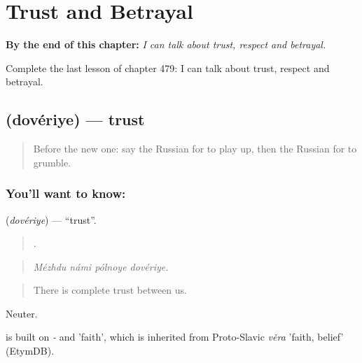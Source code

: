
\chapter{Trust and Betrayal}
\label{ch:ru-trust-and-betrayal}

\begin{chapteropening}
\textbf{By the end of this chapter:} \emph{I can talk about trust, respect and betrayal.}

Complete the last lesson of chapter 479: I can talk about trust, respect and betrayal.
\end{chapteropening}

\section[\texorpdfstring{\ru{доверие} (dovériye)}{доверие (dovériye)}]{ (dovériye) — trust}

\label{lesson:RU-C479-doveriye}



\begin{quote}
Before the new one: say the Russian for to play up, then the Russian for to grumble.
\end{quote}

\subsection*{You'll want to know: }
\textbf{} (\emph{dovériye}) — \textquotedblleft{}trust\textquotedblright{}.

\begin{quote}
   .
\end{quote}

\begin{quote}
\emph{Mézhdu námi pólnoye dovériye.}
\end{quote}

\begin{quote}
There is complete trust between us.
\end{quote}

Neuter.

\begin{cousinweb}
\emph{} is built on \emph{-} and \emph{} 'faith', which is inherited from Proto-Slavic \emph{věra} 'faith, belief' (EtymDB).
\end{cousinweb}

